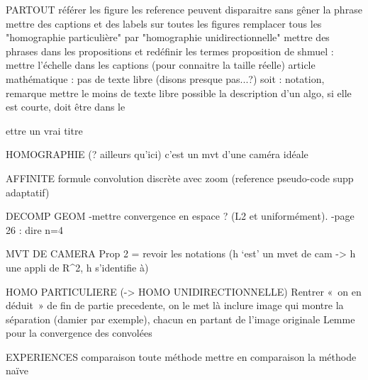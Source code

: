 PARTOUT
	référer les figure
	les reference peuvent disparaitre sans gêner la phrase
	mettre des captions et des labels sur toutes les figures
	remplacer tous les "homographie particulière" par "homographie unidirectionnelle"
	mettre des phrases dans les propositions et redéfinir les termes
	proposition de shmuel : mettre l'échelle dans les captions (pour connaitre la taille réelle)
	article mathématique : pas de texte libre (disons presque pas...?)
		soit : notation, remarque
	mettre le moins de texte libre possible
	la description d'un algo, si elle est courte, doit être dans le \caption




Mettre un vrai titre


HOMOGRAPHIE (? ailleurs qu'ici)
	c’est un mvt d’une caméra idéale



AFFINITE
	formule convolution discrète avec zoom (reference pseudo-code supp adaptatif)


DECOMP GEOM 
	-mettre convergence en espace ? (L2 et uniformément).
	-page 26 : dire n=4


MVT DE CAMERA
	Prop 2 = revoir les notations (h ‘est’ un mvet de cam -> h une appli de R^2, h s'identifie à)


HOMO PARTICULIERE (-> HOMO UNIDIRECTIONNELLE)
	Rentrer « on en déduit » de fin de partie precedente, on le met là
	inclure image qui montre la séparation (damier par exemple), chacun en partant de l'image originale
	Lemme pour la convergence des convolées



EXPERIENCES
	comparaison toute méthode
	mettre en comparaison la méthode naïve
